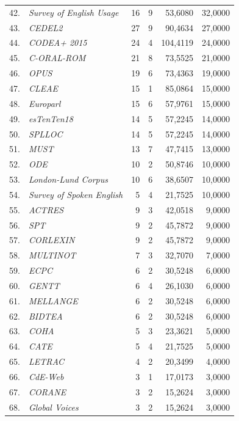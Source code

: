 \begin{longtable}{@{} r p{5cm} r r r r @{}}
42. & \textit{Survey of English Usage} & 16 & 9 & 53{,}6080 & 32{,}0000 \\
43. & \textit{CEDEL2} & 27 & 9 & 90{,}4634 & 27{,}0000 \\
44. & \textit{CODEA+ 2015} & 24 & 4 & 104{,}4119 & 24{,}0000 \\
45. & \textit{C-ORAL-ROM} & 21 & 8 & 73{,}5525 & 21{,}0000 \\
46. & \textit{OPUS} & 19 & 6 & 73{,}4363 & 19{,}0000 \\
47. & \textit{CLEAE} & 15 & 1 & 85{,}0864 & 15{,}0000 \\
48. & \textit{Europarl} & 15 & 6 & 57{,}9761 & 15{,}0000 \\
49. & \textit{esTenTen18} & 14 & 5 & 57{,}2245 & 14{,}0000 \\
50. & \textit{SPLLOC} & 14 & 5 & 57{,}2245 & 14{,}0000 \\
51. & \textit{MUST} & 13 & 7 & 47{,}7415 & 13{,}0000 \\
52. & \textit{ODE} & 10 & 2 & 50{,}8746 & 10{,}0000 \\
53. & \textit{London-Lund Corpus} & 10 & 6 & 38{,}6507 & 10{,}0000 \\
54. & \textit{Survey of Spoken English} & 5 & 4 & 21{,}7525 & 10{,}0000 \\
55. & \textit{ACTRES} & 9 & 3 & 42{,}0518 & 9{,}0000 \\
56. & \textit{SPT} & 9 & 2 & 45{,}7872 & 9{,}0000 \\
57. & \textit{CORLEXIN} & 9 & 2 & 45{,}7872 & 9{,}0000 \\
58. & \textit{MULTINOT} & 7 & 3 & 32{,}7070 & 7{,}0000 \\
59. & \textit{ECPC} & 6 & 2 & 30{,}5248 & 6{,}0000 \\
60. & \textit{GENTT} & 6 & 4 & 26{,}1030 & 6{,}0000 \\
61. & \textit{MELLANGE} & 6 & 2 & 30{,}5248 & 6{,}0000 \\
62. & \textit{BIDTEA} & 6 & 2 & 30{,}5248 & 6{,}0000 \\
63. & \textit{COHA} & 5 & 3 & 23{,}3621 & 5{,}0000 \\
64. & \textit{CATE} & 5 & 4 & 21{,}7525 & 5{,}0000 \\
65. & \textit{LETRAC} & 4 & 2 & 20{,}3499 & 4{,}0000 \\
66. & \textit{CdE-Web} & 3 & 1 & 17{,}0173 & 3{,}0000 \\
67. & \textit{CORANE} & 3 & 2 & 15{,}2624 & 3{,}0000 \\
68. & \textit{Global Voices} & 3 & 2 & 15{,}2624 & 3{,}0000 \\

\end{longtable}

